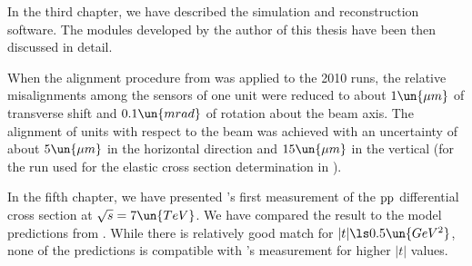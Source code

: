 In the third chapter, we have described the  simulation and reconstruction software. The modules developed by the author of this thesis have been then discussed in detail.

When the alignment procedure from  was applied to the 2010  runs, the relative misalignments among the sensors of one unit were reduced to about $1\un{\mu m}$ of transverse shift and $0.1\un{mrad}$ of rotation about the beam axis. The alignment of units with respect to the beam was achieved with an uncertainty of about $5\un{\mu m}$ in the horizontal direction and $15\un{\mu m}$ in the vertical (for the run used for the elastic cross section determination in ).

In the fifth chapter, we have presented 's first measurement of the $\rm pp$ differential cross section at $\sqrt s = 7\un{TeV}$. We have compared the result to the model predictions from . While there is relatively good match for $|t| \ls 0.5\un{GeV^2}$, none of the predictions is compatible with 's measurement for higher $|t|$ values.
